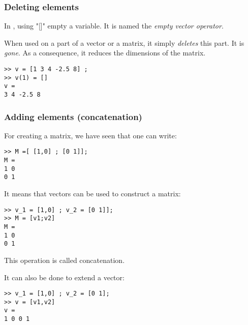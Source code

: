 \subsubsection{Deleting elements}




In \matlab, using "[]" empty a variable. It is named the \emph{empty vector operator}.
	
When used on a part of a vector or a matrix, it simply \emph{deletes} this part.
It is \emph{gone}.
As a consequence, it reduces the dimensions of the matrix.


\begin{lstlisting}
>> v = [1 3 4 -2.5 8] ;
>> v(1) = []
v = 
3 4 -2.5 8
\end{lstlisting}


\subsubsection{Adding elements (concatenation)}


For creating a matrix, we have seen that one can write:
\begin{lstlisting}
>> M =[ [1,0] ; [0 1]];
M = 
1 0
0 1
\end{lstlisting}

It means that vectors can be used to construct a matrix:
\begin{lstlisting}
>> v_1 = [1,0] ; v_2 = [0 1]];
>> M = [v1;v2]
M = 
1 0
0 1
\end{lstlisting}

This operation is called concatenation.


It can also be done to extend a vector:
\begin{lstlisting}
>> v_1 = [1,0] ; v_2 = [0 1];
>> v = [v1,v2]
v = 
1 0 0 1
\end{lstlisting}



